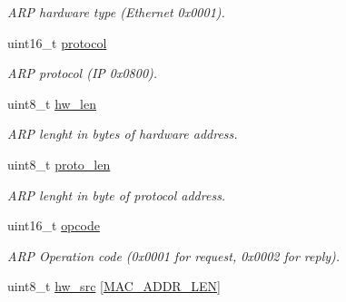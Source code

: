 \begin{DoxyCompactItemize}
\begin{DoxyCompactList}\small\item\em A\+RP hardware type (Ethernet 0x0001). \end{DoxyCompactList}\item 
uint16\+\_\+t \hyperlink{structARPFrame_ac5a44bec3334038c3968f38b03512d62}{protocol}\hypertarget{structARPFrame_ac5a44bec3334038c3968f38b03512d62}{}\label{structARPFrame_ac5a44bec3334038c3968f38b03512d62}

\begin{DoxyCompactList}\small\item\em A\+RP protocol (IP 0x0800). \end{DoxyCompactList}\item 
uint8\+\_\+t \hyperlink{structARPFrame_adb8657166976cc651661c7f32847cfaa}{hw\+\_\+len}\hypertarget{structARPFrame_adb8657166976cc651661c7f32847cfaa}{}\label{structARPFrame_adb8657166976cc651661c7f32847cfaa}

\begin{DoxyCompactList}\small\item\em A\+RP lenght in bytes of hardware address. \end{DoxyCompactList}\item 
uint8\+\_\+t \hyperlink{structARPFrame_a2cc65daf7cc240cb55d23eb536e91f03}{proto\+\_\+len}\hypertarget{structARPFrame_a2cc65daf7cc240cb55d23eb536e91f03}{}\label{structARPFrame_a2cc65daf7cc240cb55d23eb536e91f03}

\begin{DoxyCompactList}\small\item\em A\+RP lenght in byte of protocol address. \end{DoxyCompactList}\item 
uint16\+\_\+t \hyperlink{structARPFrame_a67428c1f8a3c6d981da8f14fd6fcba0c}{opcode}\hypertarget{structARPFrame_a67428c1f8a3c6d981da8f14fd6fcba0c}{}\label{structARPFrame_a67428c1f8a3c6d981da8f14fd6fcba0c}

\begin{DoxyCompactList}\small\item\em A\+RP Operation code (0x0001 for request, 0x0002 for reply). \end{DoxyCompactList}\item 
uint8\+\_\+t \hyperlink{structARPFrame_a06d60c32ce1a15bc571a56c175f97a73}{hw\+\_\+src} \mbox{[}\hyperlink{anti__arpspoof_8cpp_a60cf9af36f952be0feb59d1f49d5edff}{M\+A\+C\+\_\+\+A\+D\+D\+R\+\_\+\+L\+EN}\mbox{]}\hypertarget{structARPFrame_a06d60c32ce1a15bc571a56c175f97a73}{}\label{structARPFrame_a06d60c32ce1a15bc571a56c175f97a73}


\end{DoxyCompactItemize}
